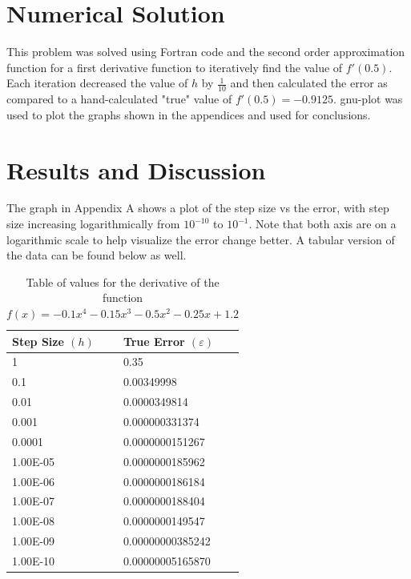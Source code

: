 \documentclass[12pt, letterpaper]{article}
\begin{document}
\section{Numerical Solution}
	This problem was solved using Fortran code and the second order approximation function for a first derivative function to iteratively find the value of $f'(0.5)$. Each iteration decreased the value of $h$ by $\frac{1}{10}$ and then calculated the error as compared to a hand-calculated "true" value of $f'(0.5)=-0.9125$. gnu-plot was used to plot the graphs shown in the appendices and used for conclusions.

\section{Results and Discussion}
	The graph in Appendix A shows a plot of the step size vs the error, with step size increasing logarithmically from $10^{-10}$ to $10^{-1}$. Note that both axis are on a logarithmic scale to help visualize the error change better. A tabular version of the data can be found below as well.
	
	\begin{table}[h]
		\centering
		\begin{tabular}{|l|l|}
			\hline
    			\textbf{Step Size $(h)$} & \textbf{True Error $(\varepsilon)$} \\ \hline
			1 & 0.35 \\ \hline
			0.1 & 0.00349998 \\ \hline
			0.01 & 0.0000349814 \\ \hline
			0.001 & 0.000000331374 \\ \hline
			0.0001 & 0.0000000151267 \\ \hline
			1.00E-05 & 0.0000000185962 \\ \hline
			1.00E-06 & 0.0000000186184 \\ \hline
			1.00E-07 & 0.0000000188404 \\ \hline
			1.00E-08 & 0.0000000149547 \\ \hline
			1.00E-09 & 0.00000000385242 \\ \hline
			1.00E-10 & 0.00000005165870 \\ \hline
		\end{tabular}
		\centering
		\caption{Table of values for the derivative of the function $f(x)=-0.1x^4-0.15x^3-0.5x^2-0.25x+1.2$}
		\label{fig:table}
	\end{table}
	
\end{document}
